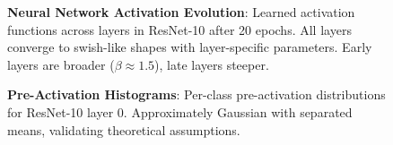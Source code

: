 \documentclass{article}
\begin{document}
\begin{figure}[t]
\centering
\caption{\textbf{Neural Network Activation Evolution}: Learned activation functions across layers in ResNet-10 after 20 epochs. All layers converge to swish-like shapes with layer-specific parameters. Early layers are broader ($\beta \approx 1.5$), late layers steeper.}
\label{fig:resnet_activations}
\end{figure}

\begin{figure}[t]
\centering
\caption{\textbf{Pre-Activation Histograms}: Per-class pre-activation distributions for ResNet-10 layer 0. Approximately Gaussian with separated means, validating theoretical assumptions.}
\label{fig:histograms}
\end{figure}
\end{document}
